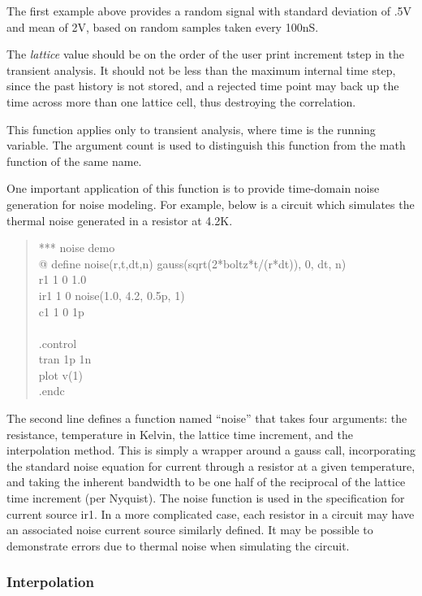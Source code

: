 The first example above provides a random signal with standard
deviation of .5V and mean of 2V, based on random samples taken every
100nS.

The {\it lattice} value should be on the order of the user print
increment {\vt tstep} in the transient analysis.  It should not be
less than the maximum internal time step, since the past history is
not stored, and a rejected time point may back up the time across more
than one lattice cell, thus destroying the correlation.

This function applies only to transient analysis, where time is the
running variable.  The argument count is used to distinguish this
function from the math function of the same name.

One important application of this function is to provide time-domain
noise generation for noise modeling\cite{jeffery}.  For example, below
is a circuit which simulates the thermal noise generated in a resistor
at 4.2K.
 
\begin{quote}\vt
*** noise demo\\
{\vt *@} define noise(r,t,dt,n) gauss(sqrt(2*boltz*t/(r*dt)), 0, dt, n)\\
r1 1 0 1.0\\
ir1 1 0 noise(1.0, 4.2, 0.5p, 1)\\
c1 1 0 1p\\
\\
.control\\
tran 1p 1n\\
plot v(1)\\
.endc\\
\end{quote}
 
The second line defines a function named ``noise'' that takes four
arguments:  the resistance, temperature in Kelvin, the lattice time
increment, and the interpolation method.  This is simply a wrapper
around a {\vt gauss} call, incorporating the standard noise equation
for current through a resistor at a given temperature, and taking the
inherent bandwidth to be one half of the reciprocal of the lattice
time increment (per Nyquist).  The noise function is used in the
specification for current source {\vt ir1}.  In a more complicated
case, each resistor in a circuit may have an associated noise current
source similarly defined.  It may be possible to demonstrate errors
due to thermal noise when simulating the circuit.

\subsubsection{Interpolation}

